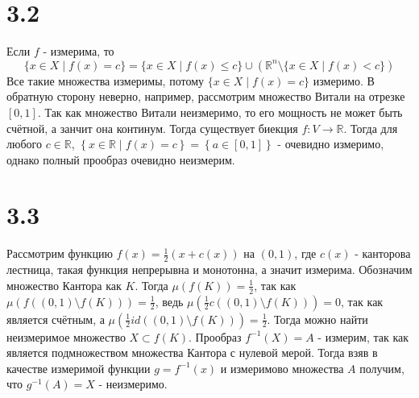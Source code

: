 \documentclass[12pt]{article}
\begin{document}
\section{3.2}
Если $f$ - измерима, то 
\[
    \{x \in X \mid f(x) = c\} = \{x \in X \mid f(x) \leq c\} \cup \left( \mathbb{R}^n \setminus \{x \in X \mid f(x) < c\} \right) 
\]  
Все такие множества измеримы, потому $\{x \in X \mid f(x) = c\}$ измеримо. 
В обратную сторону неверно, например, рассмотрим множество Витали на отрезке $[0, 1]$. Так как 
множество Витали неизмеримо, то его мощность не может быть счётной, а занчит она континум. 
Тогда существует биекция $f:V \to \mathbb{R}$. Тогда для любого $c \in \mathbb{R}$, 
$\left\{ x \in \mathbb{R} \mid f(x) = c\right\} = \left\{ a \in [0, 1] \right\}$ - очевидно измеримо, 
однако полный прообраз очевидно неизмерим. 
\section{3.3}
Рассмотрим функцию $f(x) = \frac{1}{2} (x + c(x))$ на $(0, 1)$, где $c(x)$ - канторова лестница, такая функция 
непрерывна и монотонна, а значит измерима. Обозначим 
множество Кантора как $K$. Тогда $\mu (f(K)) = \frac{1}{2}$, так как $\mu(f((0, 1) \setminus f(K))) = \frac{1}{2}$, ведь 
$\mu(\frac{1}{2}c((0, 1) \setminus f(K))) = 0$, так как является счётным, а $\mu(\frac{1}{2}id((0, 1) \setminus f(K))) = \frac{1}{2}$. 
Тогда можно найти неизмеримое множество $X \subset f(K)$. 
Прообраз $f^{-1}(X) = A$ - измерим, так как является подмножеством множества Кантора с нулевой мерой. 
Тогда взяв в качестве измеримой функции $g = f^{-1}(x)$ и измеримово множества $A$ получим, что 
$g^{-1}(A) = X$ - неизмеримо.  
\end{document}
